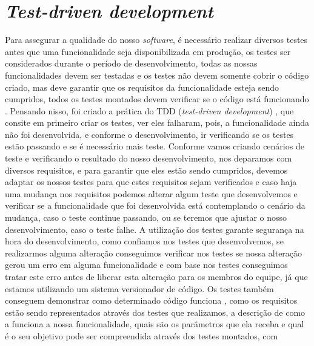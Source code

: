       \section{\textit{Test-driven development}}
        Para assegurar a qualidade do nosso \textit{software}, é necessário realizar
        diversos testes antes que uma funcionalidade seja disponibilizada em produção,
        os testes ser considerados durante o período de desenvolvimento,
        todas as nossas funcionalidades devem ser testadas e os testes não devem
        somente cobrir o código criado, mas deve garantir que os requisitos da
        funcionalidade esteja sendo cumpridos, todos os testes montados devem verificar
        se o código está funcionando \cite{CleanCode}. \newline
        Pensando nisso, foi criado a prática do TDD (\textit{test-driven development})
        \cite{TestDrivenDevelopment}, que consite em primeiro criar os testes, ver
        eles falharam, pois, a funcionalidade ainda não foi desenvolvida, e conforme
        o desenvolvimento, ir verificando se os testes estão passando e se é necessário
        mais teste. Conforme vamos criando cenários de teste e verificando o resultado
        do nosso desenvolvimento, nos deparamos com diversos requisitos, e para
        garantir que eles estão sendo cumpridos, devemos adaptar os nossos testes para
        que estes requisitos sejam verificados e caso haja uma mudança nos requisitos
        podemos alterar algum teste que desenvolvemos e verificar se a funcionalidade
        que foi desenvolvida está contemplando o cenário da mudança, caso o teste
        continue passando, ou se teremos que ajustar o nosso desenvolvimento, caso o
        teste falhe. \newline
        A utilização dos testes garante segurança na hora do desenvolvimento,
        como confiamos nos testes que desenvolvemos, se realizarmos alguma alteração
        conseguimos verificar nos testes se nossa alteração gerou um erro em alguma
        funcionalidade e com base nos testes conseguimos tratar este erro antes de
        liberar esta alteração para os membros do equipe, já que estamos utilizando um
        sistema versionador de código. Os testes também conseguem demonstrar como
        determinado código funciona \cite{martin2007agile}, como os requisitos estão
        sendo representados através dos testes que realizamos, a descrição de como
        a funciona a nossa funcionalidade, quais são os parâmetros que ela receba e
        qual é o seu objetivo pode ser compreendida através dos testes montados, com
